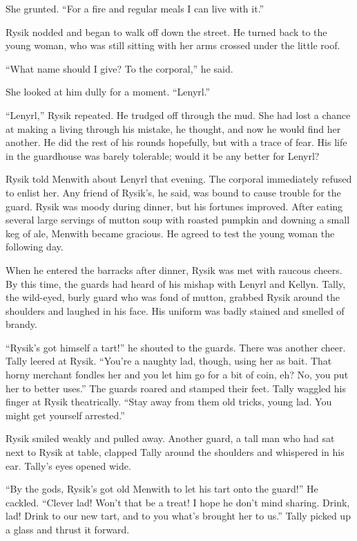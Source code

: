 \documentclass[10pt,b5paper]{article}
\begin{document}
She grunted. ``For a fire and regular meals I can live with it.''

Rysik nodded and began to walk off down the street. He turned back
to the young woman, who was still sitting with her arms crossed
under the little roof.

``What name should I give? To the corporal,'' he said.

She looked at him dully for a moment. ``Lenyrl.''

``Lenyrl,'' Rysik repeated. He trudged off through the mud. She had
lost a chance at making a living through his mistake, he thought,
and now he would find her another. He did the rest of his rounds
hopefully, but with a trace of fear. His life in the guardhouse
was barely tolerable; would it be any better for Lenyrl?

\bigskip

Rysik told Menwith about Lenyrl that evening. The corporal
immediately refused to enlist her. Any friend of Rysik's, he said,
was bound to cause trouble for the guard. Rysik was moody during
dinner, but his fortunes improved. After eating several large
servings of mutton soup with roasted pumpkin and downing a small
keg of ale, Menwith became gracious. He agreed to test the young
woman the following day.

When he entered the barracks after dinner, Rysik was met with
raucous cheers. By this time, the guards had heard of his mishap
with Lenyrl and Kellyn. Tally, the wild-eyed, burly guard who was
fond of mutton, grabbed Rysik around the shoulders and laughed in
his face. His uniform was badly stained and smelled of brandy.

``Rysik's got himself a tart!'' he shouted to the guards. There
was another cheer. Tally leered at Rysik. ``You're a naughty lad,
though, using her as bait. That horny merchant fondles her and you
let him go for a bit of coin, eh? No, you put her to better uses.''
The guards roared and stamped their feet. Tally waggled his finger at
Rysik theatrically. ``Stay away from them old tricks, young lad. You
might get yourself arrested.''

Rysik smiled weakly and pulled away. Another guard, a tall man who
had sat next to Rysik at table, clapped Tally around the shoulders
and whispered in his ear. Tally's eyes opened wide.

``By the gods, Rysik's got old Menwith to let his tart onto the
guard!'' He cackled. ``Clever lad! Won't that be a treat! I hope
he don't mind sharing. Drink, lad! Drink to our new tart, and to
you what's brought her to us.'' Tally picked up a glass and thrust
it forward.
\end{document}
